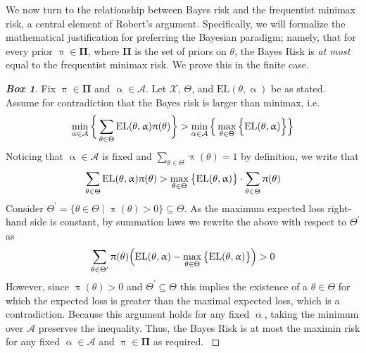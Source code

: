 \documentclass[letterpaper,12pt]{article}
\begin{document}
We now turn to the relationship between Bayes risk and the frequentist minimax risk, a central element of Robert's argument. Specifically, we will formalize the mathematical justification for preferring the Bayesian paradigm; namely, that for every prior $\uppi \in \boldsymbol{\Pi}$, where $\boldsymbol{\Pi}$ is the set of priors on $\theta$, the Bayes Risk is \textit{at most} equal to the frequentist minimax risk. We prove this in the finite case.
\vspace{-0.5cm}
\begin{framed}\vspace{-0.3cm}
\begin{proof}[\textbf{Box 1}]
Fix $\uppi \in \boldsymbol{\Pi}$ and $\upalpha \in \mathcal{A}$. Let $\mathcal{X}$, $\Theta$, and \hyperref[eq:EL]{$\text{EL}(\theta, \upalpha)$} be {as stated}. Assume for contradiction that the Bayes risk is larger than minimax, i.e.
\vspace{-0.25cm}
$$
\min_{\alpha \in \mathcal{A}}\bigg\{\sum_{\theta \in \Theta} \text{EL}(\theta, \upalpha) \uppi(\theta)\bigg\} > \min_{\alpha \in \mathcal{A}} \Big\{\max_{\theta \in \Theta}\Big\{ \text{EL}(\theta, \upalpha)\Big\}\Big\} 
\vspace{-0.25cm}
$$
\vspace{-0.25cm}
Noticing that $\upalpha \in \mathcal{A}$ is fixed and  $\sum_{\theta \in \Theta}\uppi(\theta) = 1$ by definition, we write that
\vspace{-0.25cm}
$$
\sum_{\theta \in \Theta} \text{EL}(\theta, \upalpha) \uppi(\theta) > \max_{\theta \in \Theta}\big\{ \text{EL}(\theta, \upalpha)\big\} \cdot \sum_{\theta \in \Theta}\uppi(\theta)
\vspace{-0.25cm}
$$
Consider $\Theta^{\prime} = \{\theta \in \Theta \mid \uppi(\theta) > 0\} \subseteq \Theta$. As the maximum expected loss right-hand side is constant, by summation laws we rewrite the above with respect to $\Theta^{\prime}$ as
\vspace{-0.5cm}
$$
\sum_{\theta \in \Theta^{\prime}} \uppi(\theta)\Big( \text{EL}(\theta, \upalpha) - \max_{\theta \in \Theta}\big\{ \text{EL}(\theta, \upalpha)\big\}\Big)>0 
\vspace{-0.25cm}
$$
However, since $\uppi(\theta)>0$ and $\Theta^{\prime} \subseteq \Theta$ this implies the existence of a $\theta \in \Theta$ for which the expected loss is greater than the maximal expected loss, which is a contradiction. Because this argument holds for any fixed $\upalpha$, taking the minimum over $\mathcal{A}$ preserves the inequality. Thus, the Bayes Risk is at most the maximin risk for any fixed $\upalpha \in \mathcal{A}$ and $\uppi \in \boldsymbol{\Pi}$ as required. \label{proof:box1}

\end{proof}
\end{framed}
\end{document}
